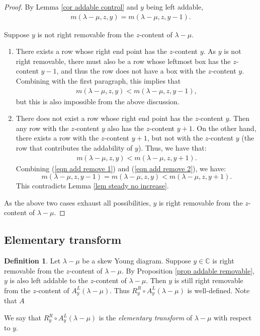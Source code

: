 \documentclass[11pt]{amsart}
\numberwithin{equation}{section}
\theoremstyle{definition}
\newtheorem{definition}[thm]{Definition}
\begin{document}
\begin{proof}

By Lemma \ref{cor addable control} and $y$ being left addable, 
\begin{align}  \label{eqn add remove 1}
m(\lambda-\mu, z, y) = m(\lambda-\mu, z, y-1)  .
\end{align}

Suppose $y$ is not right removable from the $z$-content of $\lambda-\mu$. 
\begin{enumerate}
 \item[(a)] There exists a row whose right end point has the $z$-content $y$. As $y$ is not right removable, there must also be a row whose leftmost box has the $z$-content $y-1$, and thus the row does not have a box with the $z$-content $y$. Combining with the first paragraph, this implies that
 \begin{align*}
 m(\lambda-\mu, z, y) < m(\lambda-\mu, z, y-1) ,
 \end{align*}
but this is also impossible from the above discussion.
 \item[(b)] There does not exist a row whose right end point has the $z$-content $y$. Then any row with the $z$-content $y$ also has the $z$-content $y+1$. On the other hand, there exists a row  with the $z$-content $y+1$, but not with the $z$-content $y$ (the row that contributes the addability of $y$). Thus, we have that:
 \begin{align} \label{eqn add remove 2}
 m(\lambda-\mu, z, y) < m(\lambda-\mu, z, y+1) . 
 \end{align}
Combining  (\ref{eqn add remove 1}) and (\ref{eqn add remove 2}), we have:
\[  m(\lambda-\mu, z, y-1) = m(\lambda-\mu, z, y) < m(\lambda-\mu, z, y+1) .
\]
This contradicts Lemma \ref{lem steady no increase}.
\end{enumerate}
As the above two cases exhaust all possibilities, $y$ is right removable from the $z$-content of $\lambda-\mu$.
\end{proof}




\subsection{Elementary transform}

\begin{definition} \label{def transform 1}
Let $\lambda-\mu$ be a skew Young diagram. Suppose $y \in \mathbb C$ is right removable from the $z$-content of $\lambda-\mu$. By Proposition \ref{prop addable removable}, $y$ is also left addable to the $z$-content of $\lambda-\mu$. Then $y$ is still right removable from the $z$-content of $A^L_y(\lambda-\mu)$. Thus $R^R_y\circ A^L_y(\lambda-\mu)$ is well-defined. Note that \(A\)

We say that $R^R_y\circ A^L_y(\lambda-\mu)$ is the \emph{elementary transform} of $\lambda-\mu$ with respect to $y$. 
\end{definition}
\end{document}
